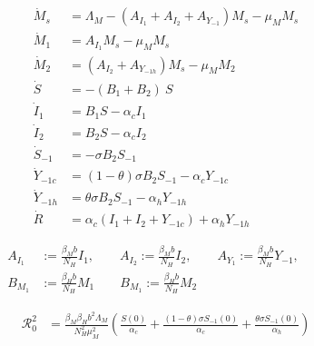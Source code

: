 
\begin{equation}
	\begin{aligned}
		\dot{M}_s &= \Lambda_M - (A_{I_1} + A_{I_2} + A_{Y_{-1}}) M_s -
			\mu_M M_s
		\\
		\dot{M}_1 &= A_{I_1} M_s -\mu_M M_s
		\\
		\dot{M}_2 &=(A_{I_2} + A_{Y_{-1h}}) M_s - \mu_M M_2
		\\
		\dot{S} &= -(B_1 + B_2)  ~ S
		\\
		\dot{I}_1 &= B_1  S - \alpha_c I_1
		\\
		\dot{I}_2 &= B_2  S - \alpha_c I_2
		\\
		\dot{S}_{-1} &= - \sigma B_2 S_{-1}
		\\
		\dot{Y}_{-1 c} &= (1 - \theta) \sigma B_2 S_{-1} - \alpha_c  Y_{-1c}
		\\
        \dot{Y}_{-1 h} &=  \theta \sigma B_2 S_{-1} - \alpha_h  Y_{-1h}
        \\
		\dot{R} & =
			\alpha_c( I_1 + I_2 + Y_{-1 c}) + \alpha_h Y_{-1 h}
	\end{aligned}
\end{equation}

\begin{equation}
	\begin{aligned}
		A_{I_1} &:= \frac{\beta_M b}{N_H} I_1, \qquad
		A_{I_2} := \frac{\beta_M b}{N_H} I_2, \qquad
		A_{Y_1} := \frac{\beta_M b}{N_H} Y_{-1}, \qquad
		\\
		B_{M_1} &:= \frac{\beta_H b}{N_H} M_1 \qquad 
		B_{M_1} := \frac{\beta_H b}{N_H} M_2
	\end{aligned}
\end{equation}

\begin{equation}
 \begin{aligned}
	 \mathcal{R}_0 ^2 &=
	 	\frac{\beta_M \beta_H b^2 \Lambda_M }{N_H^2 \mu_M^2} 
        \left(
			\frac{S(0)}{\alpha_c}
            +
            \frac{(1 - \theta) \sigma S_{-1}(0)}{\alpha_c}
            +
            \frac{\theta \sigma S_{-1}(0)}{\alpha_h}
        \right)
	\end{aligned}
\end{equation}